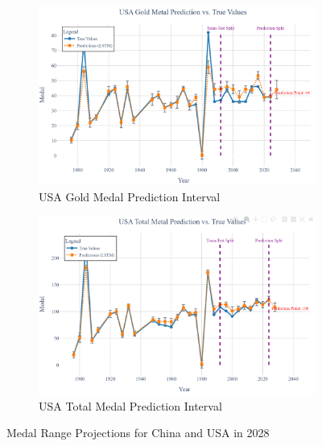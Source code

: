 \documentclass{mcmthesis}
\begin{document}
\begin{figure}[H]
	\begin{subfigure}[b]{0.48\textwidth}
		\includegraphics[width=\textwidth]{fig/USA_gold_bar.png}
		\caption{USA Gold Medal Prediction Interval}
		\label{fig:usa_gold}
	\end{subfigure}
	\hfill
	\begin{subfigure}[b]{0.48\textwidth}
		\includegraphics[width=\textwidth]{fig/USA_total_bar.png}
		\caption{USA Total Medal Prediction Interval}
		\label{fig:usa_total}
	\end{subfigure}
	\caption{Medal Range Projections for China and USA in 2028}
	\label{fig:chn_usa_pred}
\end{figure}
\end{document}
